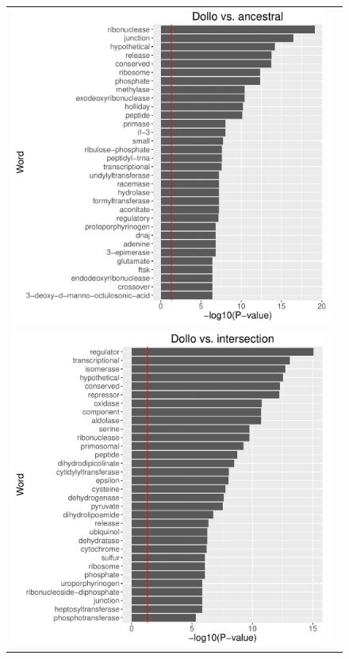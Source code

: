 \documentclass[12pt,letterpaper]{article}
\begin{document}
\begin{figure}
\begin{tabular}{c c}
\includegraphics[scale=0.4]{dollo-ancestral-pval.pdf}\\
\includegraphics[scale=0.4]{dollo-intersection-pval.pdf}&
\end{tabular}

\end{figure}
\end{document}
